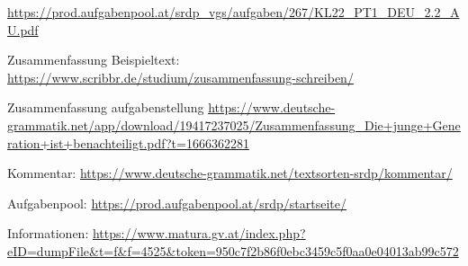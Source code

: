 \href{https://prod.aufgabenpool.at/srdp\_vgs/aufgaben/267/KL22\_PT1\_DEU\_2.2\_AU.pdf}{https://prod.aufgabenpool.at/srdp\_vgs/aufgaben/267/KL22\_PT1\_DEU\_2.2\_AU.pdf}

Zusammenfassung Beispieltext: \href{https://www.scribbr.de/studium/zusammenfassung-schreiben/}{https://www.scribbr.de/studium/zusammenfassung-schreiben/}

Zusammenfassung aufgabenstellung \href{https://www.deutsche-grammatik.net/app/download/19417237025/Zusammenfassung\_Die+junge+Generation+ist+benachteiligt.pdf?t=1666362281 }{https://www.deutsche-grammatik.net/app/download/19417237025/Zusammenfassung\_Die+junge+Generation+ist+benachteiligt.pdf?t=1666362281 }

Kommentar: \href{ https://www.deutsche-grammatik.net/textsorten-srdp/kommentar/}{ https://www.deutsche-grammatik.net/textsorten-srdp/kommentar/}

Aufgabenpool: \href{https://prod.aufgabenpool.at/srdp/startseite/}{https://prod.aufgabenpool.at/srdp/startseite/}

Informationen: \href{https://www.matura.gv.at/index.php?eID=dumpFile\&t=f\&f=4525\&token=950c7f2b86f0ebc3459c5f0aa0e04013ab99c572}{https://www.matura.gv.at/index.php?eID=dumpFile\&t=f\&f=4525\&token=950c7f2b86f0ebc3459c5f0aa0e04013ab99c572}